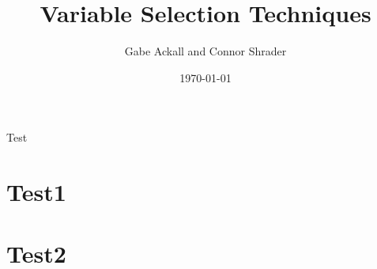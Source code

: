 \documentclass{article}
\title{Variable Selection Techniques}
\author{Gabe Ackall and Connor Shrader}
\date{\today}
\begin{document}
Test

\section{Test1}

\section{Test2}
\end{document}
